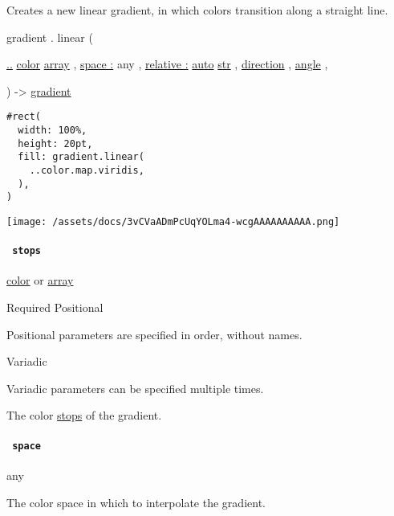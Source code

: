 Creates a new linear gradient, in which colors transition along a
straight line.

gradient { . } { linear } (

{ \hyperref[definitions-linear-parameters-stops]{..}
\href{/docs/reference/visualize/color/}{color}
\href{/docs/reference/foundations/array/}{array} , } {
\hyperref[definitions-linear-parameters-space]{space :} { any } , } {
\hyperref[definitions-linear-parameters-relative]{relative :}
\href{/docs/reference/foundations/auto/}{auto}
\href{/docs/reference/foundations/str/}{str} , } {
\href{/docs/reference/layout/direction/}{direction} , } {
\href{/docs/reference/layout/angle/}{angle} , }

) -\textgreater{} \href{/docs/reference/visualize/gradient/}{gradient}

\begin{verbatim}
#rect(
  width: 100%,
  height: 20pt,
  fill: gradient.linear(
    ..color.map.viridis,
  ),
)
\end{verbatim}

\texttt{[image: /assets/docs/3vCVaADmPcUqYOLma4-wcgAAAAAAAAAA.png]}

\paragraph{\texorpdfstring{\texttt{\ stops\ }}{ stops }}\label{definitions-linear-stops}

\href{/docs/reference/visualize/color/}{color} {or}
\href{/docs/reference/foundations/array/}{array}

{Required} {{ Positional }}

\label{definitions-linear-stops-positional-tooltip}
Positional parameters are specified in order, without names.

{{ Variadic }}

\label{definitions-linear-stops-variadic-tooltip}
Variadic parameters can be specified multiple times.

The color \hyperref[stops]{stops} of the gradient.

\paragraph{\texorpdfstring{\texttt{\ space\ }}{ space }}\label{definitions-linear-space}

{ any }

The color space in which to interpolate the gradient.

